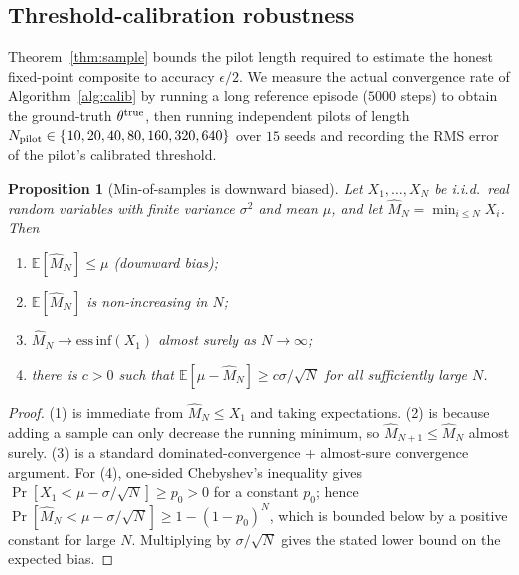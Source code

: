\documentclass[sigconf,anonymous]{acmart}
\theoremstyle{plain}
\newtheorem{proposition}{Proposition}
\theoremstyle{definition}
\theoremstyle{remark}
\begin{document}
\subsection{Threshold-calibration robustness}
\label{app:w15}
Theorem~\ref{thm:sample} bounds the pilot length required to estimate the
honest fixed-point composite to accuracy $\epsilon/2$.  We measure the
actual convergence rate of Algorithm~\ref{alg:calib} by running a long
reference episode ($5000$ steps) to obtain the ground-truth
$\theta^{\rm true}$, then running independent pilots of length
$N_{\rm pilot}\in\{10,20,40,80,160,320,640\}$ over $15$ seeds and
recording the RMS error of the pilot's calibrated threshold.

\begin{proposition}[Min-of-samples is downward biased]
\label{prop:w15}
Let $X_1,\dots,X_N$ be i.i.d.\ real random variables with finite
variance $\sigma^2$ and mean $\mu$, and let $\hat M_N=\min_{i\le N}X_i$.
Then
\begin{enumerate}[leftmargin=1.2em,topsep=1pt,itemsep=1pt]
\item $\mathbb{E}[\hat M_N]\le\mu$ (downward bias);
\item $\mathbb{E}[\hat M_N]$ is non-increasing in $N$;
\item $\hat M_N\to\mathrm{ess\,inf}(X_1)$ almost surely as $N\to\infty$;
\item there is $c>0$ such that $\mathbb{E}[\mu-\hat M_N]\ge c\sigma/
  \sqrt N$ for all sufficiently large $N$.
\end{enumerate}
\end{proposition}

\begin{proof}
(1) is immediate from $\hat M_N\le X_1$ and taking expectations.
(2) is because adding a sample can only decrease the running minimum,
so $\hat M_{N+1}\le\hat M_N$ almost surely.  (3) is a standard
dominated-convergence + almost-sure convergence argument.  For (4),
one-sided Chebyshev's inequality gives $\Pr[X_1<\mu-\sigma/\sqrt N]\ge
p_0>0$ for a constant $p_0$; hence $\Pr[\hat M_N<\mu-\sigma/\sqrt N]\ge
1-(1-p_0)^N$, which is bounded below by a positive constant for large
$N$.  Multiplying by $\sigma/\sqrt N$ gives the stated lower bound on the
expected bias.
\end{proof}
\end{document}
